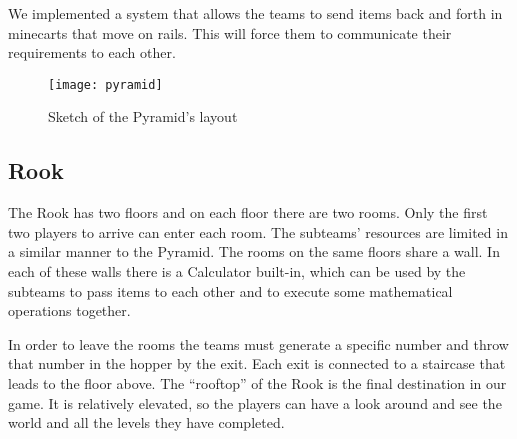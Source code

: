 We implemented a system that allows the teams to send items back and forth in minecarts that move on rails. This will force them to communicate their requirements to each other.

\begin{figure}[h!]
\label{fig:pyramid-layout}
\caption{Sketch of the Pyramid's layout}
\centering
\texttt{[image: pyramid]}
\end{figure}

\subsection{Rook}
The Rook has two floors and on each floor there are two rooms. Only the first two players to arrive can enter each room. The subteams’ resources are limited in a similar manner to the Pyramid. The rooms on the same floors share a wall. In each of these walls there is a Calculator built-in, which can be used by the subteams to pass items to each other and to execute some mathematical operations together.

In order to leave the rooms the teams must generate a specific number and throw that number in the hopper by the exit. Each exit is connected to a staircase that leads to the floor above. The “rooftop” of the Rook is the final destination in our game. It is relatively elevated, so the players can have a look around and see the world and all the levels they have completed.
